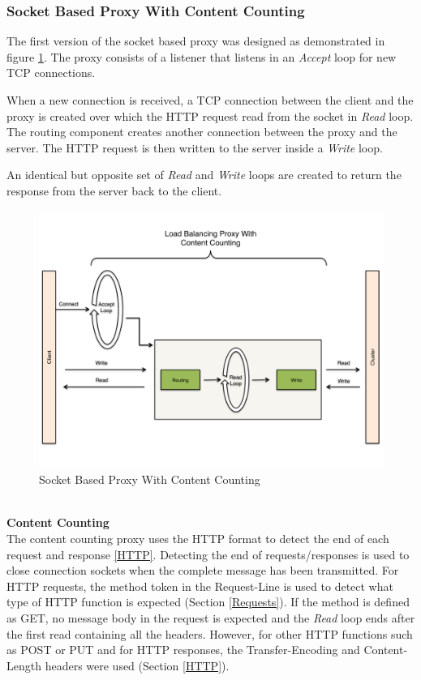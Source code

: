 \documentclass[a4paper,11pt,twoside]{article}
\begin{document}
\subsubsection{Socket Based Proxy With Content Counting}\label{Content-Counting}
The first version of the socket based proxy was designed as demonstrated in figure \ref{content_counting_proxy}. The proxy consists of a listener that listens in an  \textit{Accept} loop for new TCP connections. 

When a new connection is received, a TCP connection between the client and the proxy is created over which the HTTP request read from the socket in \textit{Read} loop.  The routing component creates another connection between the proxy and the server.  The HTTP request is then written to the server inside a \textit{Write} loop.

An identical but opposite set of \textit{Read} and \textit{Write} loops are created to return the response from the server back to the client.

\begin{figure}[!ht]
  \centering
     \includegraphics[scale=0.31]{content_counting_proxy}
  \caption{Socket Based Proxy With Content Counting}
  \label{content_counting_proxy}
\end{figure}

\noindent\\
\textbf{Content Counting}\\
The content counting proxy uses the HTTP format to detect the end of each request and response \ref{HTTP}. Detecting the end of requests/responses is used to close connection sockets when the complete message has been transmitted.   For HTTP requests, the method token in the Request-Line is used to detect what type of HTTP function is expected (Section \ref{Requests}). If the method is defined as GET, no message body in the request is expected and the \textit{Read} loop ends after the first read containing all the headers. However, for other HTTP functions such as POST or PUT and for HTTP responses, the Transfer-Encoding and Content-Length headers were used (Section \ref{HTTP}). 
\end{document}
